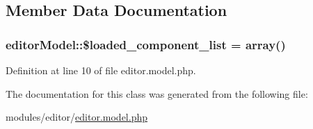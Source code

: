 \subsection{Member Data Documentation}
\hypertarget{classeditorModel_ad909303f399467f4bd587e8369eb40a1}{
\subsubsection[{\$loaded\-\_\-component\-\_\-list}]{\setlength{\rightskip}{0pt plus 5cm}editor\-Model\-::\$loaded\-\_\-component\-\_\-list = array()}}\label{classeditorModel_ad909303f399467f4bd587e8369eb40a1}


Definition at line 10 of file editor.\-model.\-php.



The documentation for this class was generated from the following file\-:\begin{DoxyCompactItemize}
\item 
modules/editor/\hyperlink{editor_8model_8php}{editor.\-model.\-php}\end{DoxyCompactItemize}
